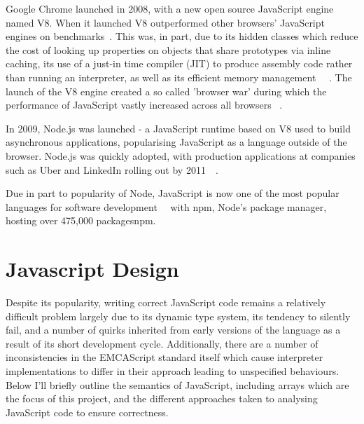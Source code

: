 \documentclass[]{final_report}
\begin{document}
Google Chrome launched in 2008, with a new open source JavaScript engine named V8. When it launched V8 outperformed other browsers' JavaScript engines on benchmarks~\cite{chromebenchmarks}. This was, in part, due to its hidden classes which reduce the cost of looking up properties on objects that share prototypes via inline caching, its use of a just-in time compiler (JIT) to produce assembly code rather than running an interpreter, as well as its efficient memory management ~\cite{chromeengine}~\cite{chromeengine2}. The launch of the V8 engine created a so called 'browser war' during which the performance of JavaScript vastly increased across all browsers ~\cite{knowyourenginesmozilla}.

In 2009, Node.js was launched - a JavaScript runtime based on V8 used to build asynchronous applications, popularising JavaScript as a language outside of the browser. Node.js was quickly adopted, with production applications at companies such as Uber and LinkedIn rolling out by 2011~\cite{linkedinusesnode}~\cite{uberusesnode}. 

Due in part to popularity of Node, JavaScript is now one of the most popular languages for software development~\cite{stackoverflowsurvey}~\cite{tiobeindex2017nov} with npm, Node's package manager, hosting over 475,000 packagesnpm.

\section{Javascript Design}

Despite its popularity, writing correct JavaScript code remains a relatively difficult problem largely due to its dynamic type system, its tendency to silently fail, and a number of quirks inherited from early versions of the language as a result of its short development cycle. Additionally, there are a number of inconsistencies in the EMCAScript standard itself which cause interpreter implementations to differ in their approach leading to unspecified behaviours. ~\cite{park2015kjs} Below I'll briefly outline the semantics of JavaScript, including arrays which are the focus of this project, and the different approaches taken to analysing JavaScript code to ensure correctness.
\end{document}
